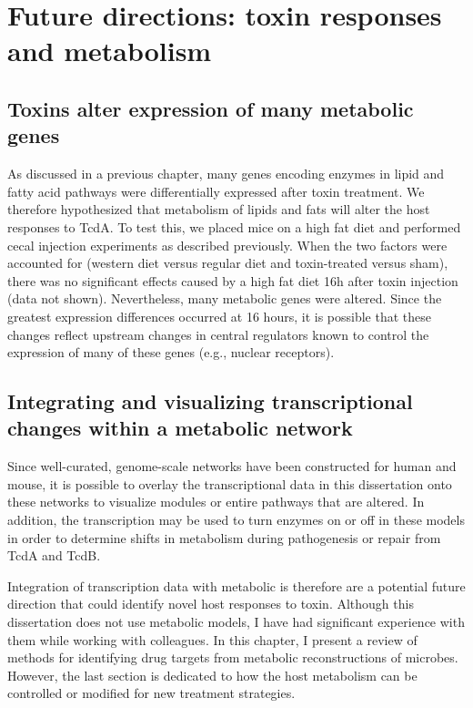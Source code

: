 
\chapter{ Future directions: toxin responses and metabolism }\label{chapter:trends}

\section{Toxins alter expression of many metabolic genes}
As discussed in a previous chapter, many genes encoding enzymes
in lipid and fatty acid pathways were differentially expressed
after toxin treatment. We therefore hypothesized that metabolism
of lipids and fats will alter the host responses to TcdA.
To test this, we placed mice on a high fat diet and performed
cecal injection experiments as described previously.
When the two factors were accounted for (western diet versus regular diet and
toxin-treated versus sham), there was no significant effects
caused by a high fat diet 16h after toxin injection (data not shown).
Nevertheless, many metabolic genes were altered. 
Since the greatest expression differences
occurred at 16 hours, it is possible that these changes
reflect upstream changes in central regulators known to
control the expression of many of these genes (e.g., nuclear receptors).

\section{Integrating and visualizing transcriptional changes within a metabolic network}
Since well-curated, genome-scale networks have been
constructed for human and mouse, it is possible to overlay
the transcriptional data in this dissertation onto these networks
to visualize modules or entire pathways that are altered.
In addition, the transcription may be used to turn enzymes on or
off in these models in order to determine shifts in metabolism
during pathogenesis or repair from TcdA and TcdB. 

Integration of transcription data with metabolic 
is therefore are a potential future direction that could
identify novel host responses to toxin. Although this dissertation
does not use metabolic models, I have had significant experience
with them while working with colleagues. In this chapter,
I present a review of methods for identifying drug targets
from metabolic reconstructions of microbes. However, the last
section is dedicated to how the host metabolism can be controlled
or modified for new treatment strategies.

